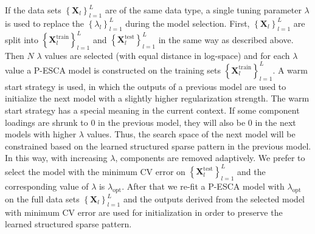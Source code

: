 If the data sets $\left\{ \mathbf{X}_l \right\}_{l=1}^{L}$ are of the same data type, a single tuning parameter $\lambda$ is used to replace the $\left\{ \lambda_l \right\}_{l=1}^{L}$ during the model selection. First, $\left\{ \mathbf{X}_l \right\}_{l=1}^{L}$ are split into $\left\{ \mathbf{X}_l^{\text{train}} \right\}_{l=1}^{L}$ and $\left\{ \mathbf{X}_l^{\text{test}} \right\}_{l=1}^{L}$ in the same way as described above. Then $N$ $\lambda$ values are selected (with equal distance in log-space) and for each $\lambda$ value a P-ESCA model is constructed on the training sets $\left\{ \mathbf{X}_l^{\text{train}} \right\}_{l=1}^{L}$. A warm start strategy is used, in which the outputs of a previous model are used to initialize the next model with a slightly higher regularization strength. The warm start strategy has a special meaning in the current context. If some component loadings are shrunk to 0 in the previous model, they will also be 0 in the next models with higher $\lambda$ values. Thus, the search space of the next model will be constrained based on the learned structured sparse pattern in the previous model. In this way, with increasing $\lambda$, components are removed adaptively. We prefer to select the model with the minimum CV error on $\left\{\mathbf{X}_l^{\text{test}} \right\}_{l=1}^{L}$ and the corresponding value of $\lambda$ is $\lambda_{\text{opt}}$. After that we re-fit a P-ESCA model with $\lambda_{\text{opt}}$ on the full data sets $\left\{ \mathbf{X}_l \right\}_{l=1}^{L}$ and the outputs derived from the selected model with minimum CV error are used for initialization in order to preserve the learned structured sparse pattern.

